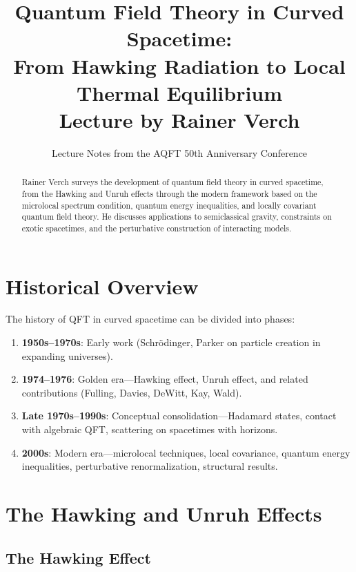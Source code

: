 \documentclass[11pt,a4paper]{article}
\title{\textbf{Quantum Field Theory in Curved Spacetime:\\From Hawking Radiation to Local Thermal Equilibrium}\\[6pt]
\large Lecture by Rainer Verch}
\author{Lecture Notes from the AQFT 50th Anniversary Conference}
\date{}
\begin{document}
\maketitle

\begin{abstract}
Rainer Verch surveys the development of quantum field theory in curved spacetime,
from the Hawking and Unruh effects through the modern framework based on the
microlocal spectrum condition, quantum energy inequalities, and locally covariant
quantum field theory. He discusses applications to semiclassical gravity, constraints
on exotic spacetimes, and the perturbative construction of interacting models.
\end{abstract}

\tableofcontents

\section{Historical Overview}

The history of QFT in curved spacetime can be divided into phases:
\begin{enumerate}[nosep]
  \item \textbf{1950s--1970s}: Early work (Schr\"odinger, Parker on particle
        creation in expanding universes).
  \item \textbf{1974--1976}: Golden era---Hawking effect, Unruh effect, and
        related contributions (Fulling, Davies, DeWitt, Kay, Wald).
  \item \textbf{Late 1970s--1990s}: Conceptual consolidation---Hadamard states,
        contact with algebraic QFT, scattering on spacetimes with horizons.
  \item \textbf{2000s}: Modern era---microlocal techniques, local covariance,
        quantum energy inequalities, perturbative renormalization, structural
        results.
\end{enumerate}

\section{The Hawking and Unruh Effects}

\subsection{The Hawking Effect}
\end{document}
